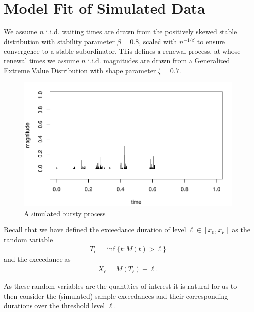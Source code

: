 \documentclass[honours,12pt]{UNSWthesis}
\newcommand{\1}{\mathbf 1}
\numberwithin{equation}{section}
\theoremstyle{definition}
\theoremstyle{remark}
\begin{document}
\section{Model Fit of Simulated Data}
We assume $n$ i.i.d. waiting times are drawn from the positively skewed stable
distribution with stability parameter $\beta=0.8$, scaled with 
$n^{-1/\beta}$ to ensure convergence to a stable subordinator. This defines a renewal process, at whose renewal times we assume $n$ i.i.d. magnitudes are drawn from a Generalized Extreme Value Distribution
with shape parameter $\xi = 0.7$.
	
	\begin{figure}[H]
        \centering
        \caption{A simulated bursty process}
        \includegraphics[scale=0.45]{Figures/unitCTRMprocessNoTitle.png}
    \end{figure}

Recall that we have defined the exceedance duration of level $\ell \in [x_0,x_F]$ as
the random variable
\begin{align*}
T_\ell = \inf\{t: M(t) > \ell\}
\end{align*}
and the exceedance as 
\begin{align*}
X_\ell = M(T_\ell) - \ell.
\end{align*}

As these random variables are the quantities of interest it is natural for us to then consider the (simulated) sample exceedances and their corresponding durations over the threshold level $\ell$.
	
\end{document}
